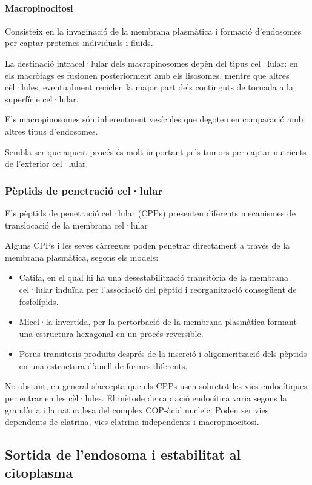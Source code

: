 \paragraph{Macropinocitosi}
Consisteix en la invaginació de la membrana plasmàtica i formació d'endosomes per captar proteïnes individuals i fluids.

La destinació intracel·lular dels macropinosomes depèn del tipus cel·lular: en els macròfags es fusionen posteriorment amb els lisosomes, mentre que altres cèl·lules, eventualment reciclen la major part dels continguts de tornada a la superfície cel·lular.

Els macropinosomes són inherentment vesícules que degoten en comparació amb altres tipus d'endosomes.

Sembla ser que aquest procés és molt important pels tumors per captar nutrients de l'exterior cel·lular.

\subsubsection{Pèptids de penetració cel·lular}
\label{sec:pept-de-penetr}
Els pèptids de penetració cel·lular (CPPs) presenten diferents mecanismes de translocació de la membrana cel·lular

Alguns CPPs i les seves càrregues poden penetrar directament a través de la membrana plasmàtica, segons els models: 
\begin{itemize}
\item Catifa, en el qual hi ha una desestabilització transitòria de la membrana cel·lular induïda per l'associació del pèptid i reorganització consegüent de fosfolípids.
\item Micel·la invertida, per la pertorbació de la membrana plasmàtica formant una estructura hexagonal en un procés reversible.
\item Porus transitoris produïts després de la inserció i oligomerització dels pèptids en una estructura d'anell de formes diferents.
\end{itemize}

No obstant, en general s'accepta que els CPPs usen sobretot les vies endocítiques per entrar en les cèl·lules. El mètode de captació endocítica varia segons la grandària i la naturalesa del complex COP-àcid nucleic. Poden ser vies dependents de clatrina, vies clatrina-independents i macropinocitosi.

\subsection{Sortida de l'endosoma i estabilitat al citoplasma}
\label{sec:sortida-de-lendosoma}

